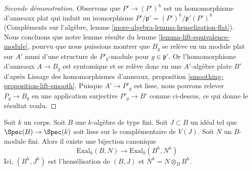 \begin{proof}[Seconde démonstration]
\medskip\noindent
Observons que $P' \to (P')^h$ est un homomorphisme d'anneaux plat qui
induit un isomorphisme $P'/\mathfrak p' = (P')^h/\mathfrak p'(P')^h$
(Compléments sur l'algèbre, lemme \ref{more-algebra-lemma-henselization-flat}).
Nous concluons que notre lemme résulte du
lemme \ref{lemma-lift-equivalence-module}, pourvu que nous puissions
montrer que $B_g$ se relève en un module plat sur $A'$ muni d'une structure de $P'_g$-module pour
$g \in \mathfrak p'$. Or l'homomorphisme d'anneaux $A \to B_g$ est syntomique
et se relève donc en une $A'$-algèbre plate $B'$ d'après
Lissage des homomorphismes d'anneaux, proposition \ref{smoothing-proposition-lift-smooth}.
Puisque $A' \to P'_g$ est lisse, nous pouvons relever $P_g \to B_g$
en une application surjective $P'_g \to B'$ comme ci-dessus, ce qui donne le résultat voulu.
\end{proof}

\begin{lemma}
\label{lemma-first-order-henselization}
Soit $k$ un corps. Soit $B$ une $k$-algèbre de type fini.
Soit $J \subset B$ un idéal tel que
$\Spec(B) \to \Spec(k)$ soit lisse sur le complémentaire de $V(J)$.
Soit $N$ un $B$-module fini.
Alors il existe une bijection canonique
$$
\text{Exal}_k(B, N) \to \text{Exal}_k(B^h, N^h)
$$
Ici, $(B^h, J^h)$ est l'hensélisation de $(B, J)$
et $N^h = N \otimes_B B^h$.
\end{lemma}

